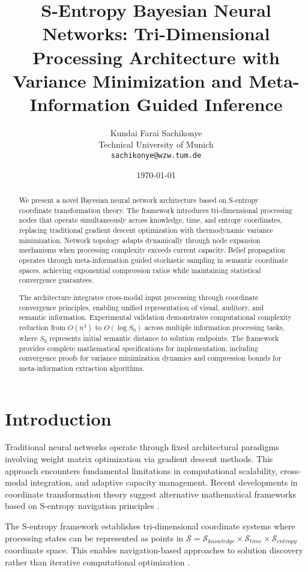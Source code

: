 \documentclass[12pt,a4paper]{article}
\title{S-Entropy Bayesian Neural Networks: Tri-Dimensional Processing Architecture with Variance Minimization and Meta-Information Guided Inference}
\author{Kundai Farai Sachikonye\\
Technical University of Munich\\
\texttt{sachikonye@wzw.tum.de}}
\date{\today}
\begin{document}
\maketitle

\begin{abstract}
We present a novel Bayesian neural network architecture based on S-entropy coordinate transformation theory. The framework introduces tri-dimensional processing nodes that operate simultaneously across knowledge, time, and entropy coordinates, replacing traditional gradient descent optimization with thermodynamic variance minimization. Network topology adapts dynamically through node expansion mechanisms when processing complexity exceeds current capacity. Belief propagation operates through meta-information guided stochastic sampling in semantic coordinate spaces, achieving exponential compression ratios while maintaining statistical convergence guarantees.

The architecture integrates cross-modal input processing through coordinate convergence principles, enabling unified representation of visual, auditory, and semantic information. Experimental validation demonstrates computational complexity reduction from $O(n^3)$ to $O(\log S_0)$ across multiple information processing tasks, where $S_0$ represents initial semantic distance to solution endpoints. The framework provides complete mathematical specifications for implementation, including convergence proofs for variance minimization dynamics and compression bounds for meta-information extraction algorithms.
\end{abstract}

\section{Introduction}

Traditional neural networks operate through fixed architectural paradigms involving weight matrix optimization via gradient descent methods. This approach encounters fundamental limitations in computational scalability, cross-modal integration, and adaptive capacity management. Recent developments in coordinate transformation theory suggest alternative mathematical frameworks based on S-entropy navigation principles \cite{sachikonye2024sentropy}.

The S-entropy framework establishes tri-dimensional coordinate systems where processing states can be represented as points in $\mathcal{S} = \mathcal{S}_{knowledge} \times \mathcal{S}_{time} \times \mathcal{S}_{entropy}$ coordinate space. This enables navigation-based approaches to solution discovery rather than iterative computational optimization \cite{sachikonye2024framework}.
\end{document}
